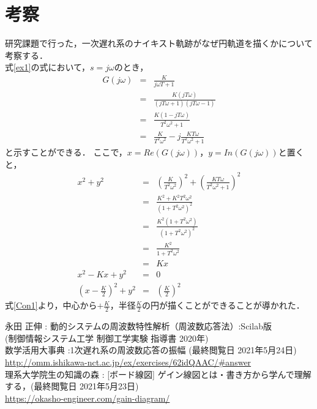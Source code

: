 \documentclass[a4paper,11pt]{jsarticle}
\begin{document}
\section{考察}
  研究課題で行った，一次遅れ系のナイキスト軌跡がなぜ円軌道を描くかについて考察する．\\
  式\ref{ex1}の式において，$s=j\omega$のとき，\\
  \begin{eqnarray}
    G(j\omega) &=& \frac{K}{j\omega T + 1} \nonumber \\
              &=& \frac{K(jT\omega)}{(jT\omega+1)(jT\omega-1)} \nonumber \\
              &=& \frac{K(1-jT\omega)}{T^2\omega^2+1} \nonumber \\
              &=& \frac{K}{T^2\omega^2}-j\frac{KT\omega}{T^2\omega^2+1}
  \end{eqnarray}
  と示すことができる．
  ここで，$x = Re(G(j\omega))$，$y = In(G(j\omega))$と置くと，
  \begin{eqnarray}
    x^2+y^2 &=& {\left(\frac{K}{T^2\omega^2}\right)}^2+{\left(\frac{KT\omega}{T^2\omega^2+1}\right)}^2 \nonumber \\
    &=& \frac{K^2+K^2T^2\omega^2}{(1+T^2\omega^2)^2} \nonumber \\
    &=& \frac{K^2(1+T^2\omega^2)}{(1+T^2\omega^2)^2} \nonumber \\
    &=& \frac{K^2}{1+T^2\omega^2} \nonumber \\
    &=& Kx \nonumber \\
    x^2 -Kx + y^2 &=& 0 \nonumber \\
    {\left(x - \frac{K}{2}\right)}^2  + y^2 &=& {\left(\frac{K}{2}\right)}^2 \label{Con1}
  \end{eqnarray}
  式\ref{Con1}より，中心から$+\frac{K}{2}$，半径$\frac{K}{2}$の円が描くことができることが導かれた．

\begin{thebibliography}{4}
   永田 正伸 : 動的システムの周波数特性解析（周波数応答法）:Scilab版 \\(制御情報システム工学 制御工学実験 指導書 2020年) \\
   数学活用大事典 :1次遅れ系の周波数応答の振幅 (最終閲覧日 2021年5月24日)\\ \url{http://omm.ishikawa-nct.ac.jp/ex/exercises/62idQAAC/#answer} \\
   理系大学院生の知識の森 : [ボード線図] ゲイン線図とは・書き方から学んで理解する，(最終閲覧日 2021年5月23日) \\\url{https://okasho-engineer.com/gain-diagram/}
\end{thebibliography}
\end{document}

